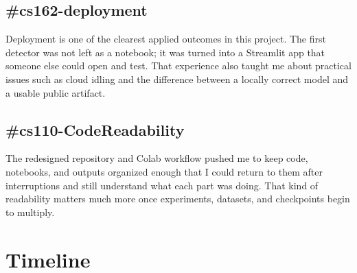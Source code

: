 \documentclass[11pt]{article}
\begin{document}
\subsection*{\#cs162-deployment}
Deployment is one of the clearest applied outcomes in this project. The first detector was not left as a notebook; it was turned into a Streamlit app that someone else could open and test. That experience also taught me about practical issues such as cloud idling and the difference between a locally correct model and a usable public artifact.

\subsection*{\#cs110-CodeReadability}
The redesigned repository and Colab workflow pushed me to keep code, notebooks, and outputs organized enough that I could return to them after interruptions and still understand what each part was doing. That kind of readability matters much more once experiments, datasets, and checkpoints begin to multiply.

\section{Timeline}
\end{document}
